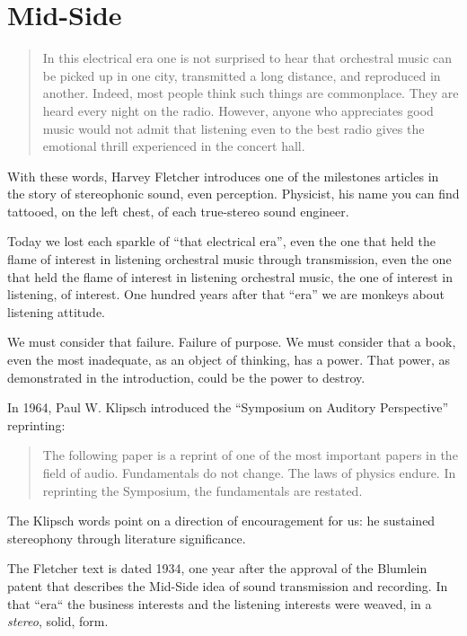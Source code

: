 \documentclass{article}
\begin{document}
\section{Mid-Side}
\label{sec:midside}

\begin{quotation}
In this electrical era one is not surprised to hear that orchestral music can be picked up in one city, transmitted a long distance, and reproduced in another. Indeed, most people think such things are commonplace. They are heard every night on the radio. However, anyone who appreciates good music would not admit that listening even to the best radio gives the emotional thrill experienced in the concert hall. \cite{hf34}
\end{quotation}

With these words, Harvey Fletcher introduces one of the milestones articles in the story of stereophonic sound, even perception. Physicist, his name you can find tattooed, on the left chest, of each true-stereo sound engineer. 

Today we lost each sparkle of “that electrical era”, even the one that held the flame of interest in listening orchestral music through transmission, even the one that held the flame of interest in listening orchestral music, the one of interest in listening, of interest. One hundred years after that “era” we are monkeys about listening attitude. 

We must consider that failure. Failure of purpose. We must consider that a book, even the most inadequate, as an object of thinking, has a power. That power, as demonstrated in the introduction, could be the power to destroy. 

In 1964, Paul W. Klipsch introduced the “Symposium on Auditory Perspective” reprinting:

\begin{quotation}
The following paper is a reprint of one of the most important papers in the field of audio. Fundamentals do not change. The laws of physics endure. In reprinting the Symposium, the fundamentals are restated. \cite{sap1964}
\end{quotation}

The Klipsch words point on a direction of encouragement for us: he sustained stereophony through literature significance. 

The Fletcher \cite{hf34} text is dated 1934, one year after the approval of the Blumlein patent that describes the Mid-Side idea of sound transmission and recording. In that “era“ the business interests and the listening interests were weaved, in a \emph{stereo}, solid, form. 
\end{document}
